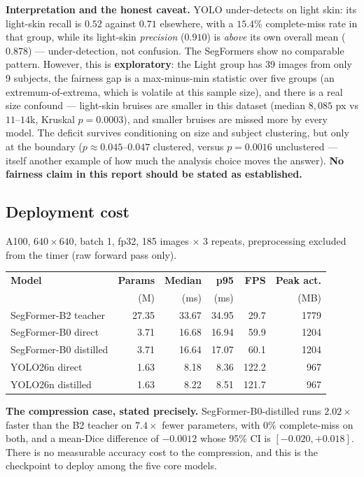 \documentclass[11pt]{article}
\begin{document}
\textbf{Interpretation and the honest caveat.} YOLO under-detects on light skin: its light-skin
recall is $0.52$ against $0.71$ elsewhere, with a $15.4\%$ complete-miss rate in that group, while
its light-skin \emph{precision} ($0.910$) is \emph{above} its own overall mean ($0.878$) ---
under-detection, not confusion. The
SegFormers show no comparable pattern. However, this is \textbf{exploratory}: the Light group has
39 images from only 9 subjects, the fairness gap is a max-minus-min statistic over five groups
(an extremum-of-extrema, which is volatile at this sample size), and there is a real size
confound --- light-skin bruises are smaller in this dataset (median $8{,}085$ px vs $11$--$14$k,
Kruskal $p=0.0003$), and smaller bruises are missed more by every model. The deficit survives
conditioning on size and subject clustering, but only at the boundary
($p\approx0.045$--$0.047$ clustered, versus $p=0.0016$ unclustered --- itself another example of
how much the analysis choice moves the answer). \textbf{No fairness claim in this report should be
stated as established.}

\subsection{Deployment cost}

A100, $640\times640$, batch 1, fp32, 185 images $\times$ 3 repeats, preprocessing excluded from
the timer (raw forward pass only).

\begin{center}\small
\begin{tabular}{L n n n n n}
\toprule
\textbf{Model} & \textbf{Params} & \textbf{Median} & \textbf{p95} & \textbf{FPS} &
\textbf{Peak act.} \\
 & (M) & (ms) & (ms) & & (MB) \\
\midrule
SegFormer-B2 teacher   & 27.35 & 33.67 & 34.95 & 29.7  & 1779 \\
SegFormer-B0 direct    & 3.71  & 16.68 & 16.94 & 59.9  & 1204 \\
SegFormer-B0 distilled & 3.71  & 16.64 & 17.07 & 60.1  & 1204 \\
YOLO26n direct         & 1.63  & 8.18  & 8.36  & 122.2 & 967 \\
YOLO26n distilled      & 1.63  & 8.22  & 8.51  & 121.7 & 967 \\
\bottomrule
\end{tabular}
\end{center}

\begin{keybox}
\textbf{The compression case, stated precisely.} SegFormer-B0-distilled runs $2.02\times$ faster
than the B2 teacher on $7.4\times$ fewer parameters, with $0\%$ complete-miss on both, and a
mean-Dice difference of $-0.0012$ whose 95\% CI is $[-0.020,+0.018]$. There is no measurable
accuracy cost to the compression, and this is the checkpoint to deploy among the five core models.
\end{keybox}
\end{document}
